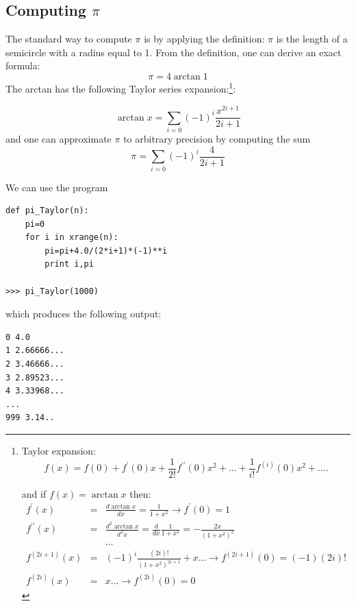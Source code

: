 \documentclass[justified,sixbynine]{tufte-book}
\theoremstyle{plain}%
\theoremstyle{definition}
\theoremstyle{remark}
\begin{document}
\begin{fullwidth}
\goodbreak\subsection{Computing $\pi$}

The standard way to compute $\pi $ is by applying the definition: $\pi $ is
the length of a semicircle with a radius equal to 1. From the definition, one can
derive an exact formula:
\begin{equation}
\pi =4\arctan 1
\end{equation}
The arctan has the following Taylor series expansion:\footnote{%
Taylor expansion:
\begin{equation}
f(x)=f(0)+f^{\prime }(0)x+\frac 1{2!}f^{\prime \prime }(0)x^2+...+\frac
1{i!}f^{(i)}(0)x^2+....
\end{equation}
\par
and if $f(x)=\arctan x$ then:
\begin{eqnarray}
f^{\prime }(x) &=&\frac{d\arctan x}{dx}=\frac 1{1+x^2}\rightarrow f^{\prime
}(0)=1 \\
f^{\prime \prime }(x) &=&\frac{d^2\arctan x}{d^2x}=\frac d{dx}\frac
1{1+x^2}=-\frac{2x}{(1+x^2)^2} \\
&&... \\
f^{(2i+1)}(x) &=&(-1)^i\frac{(2i)!}{(1+x^2)^{2i+1}}+x...\rightarrow
f^{(2i+1)}(0)=(-1)(2i)! \\
f^{(2i)}(x) &=&x...\rightarrow f^{(2i)}(0)=0
\end{eqnarray}
}:

\begin{equation}
\arctan x=\allowbreak \sum_{i=0}(-1)^i\frac{x^{2i+1}}{2i+1}
\end{equation}
and one can approximate $\pi $ to arbitrary precision by computing the sum
\begin{equation}
\pi =\allowbreak \sum_{i=0}(-1)^i\frac 4{2i+1}
\end{equation}

We can use the program
\begin{lstlisting}
def pi_Taylor(n):
    pi=0
    for i in xrange(n):
        pi=pi+4.0/(2*i+1)*(-1)**i
        print i,pi

>>> pi_Taylor(1000)
\end{lstlisting}

which produces the following output:
\begin{lstlisting}
0 4.0
1 2.66666...
2 3.46666...
3 2.89523...
4 3.33968...
...
999 3.14..
\end{lstlisting}


\end{fullwidth}
\end{document}
